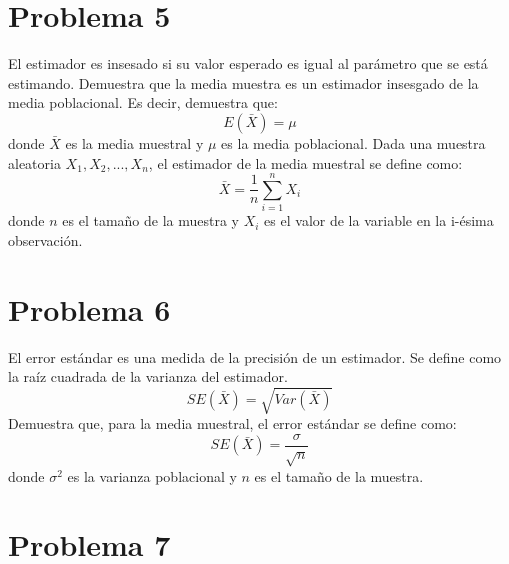 \documentclass[]{article}
\begin{document}
\section*{Problema 5}

El estimador es insesado si su valor esperado es igual al parámetro que se está estimando. Demuestra que la media muestra es un estimador insesgado de la media poblacional. Es decir, demuestra que: 
$$E(\bar{X})=\mu$$
donde $\bar{X}$ es la media muestral y $\mu$ es la media poblacional.
Dada una muestra aleatoria ${X_1,X_2,...,X_n}$, el estimador de la media muestral se define como: 
$$
\bar{X}	=	\frac{1}{n}	\sum_{i=1}^{n}	X_i
$$
donde $n$ es el tamaño de la muestra y $X_i$ es el valor de la variable en la i-ésima observación.

\section*{Problema 6}

El error estándar es una medida de la precisión de un estimador. Se define como la raíz cuadrada de la varianza del estimador. 
$$
SE(\bar{X})=\sqrt{Var(\bar{X})}
$$
Demuestra que, para la media muestral, el error estándar se define como: 
$$
SE(\bar{X})=\frac{\sigma}{\sqrt{n}}
$$
donde $\sigma^2$ es la varianza poblacional y $n$ es el tamaño de la muestra.

\section*{Problema 7}
\end{document}
